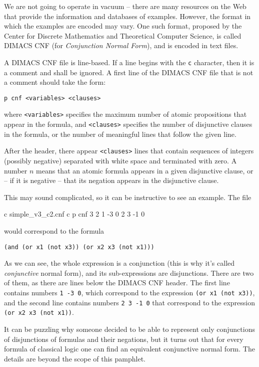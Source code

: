 We are not going to operate in vacuum -- there are many
resources on the Web that provide the information and databases
of examples. However, the format in which the examples are
encoded may vary. One such format, proposed by the Center
for Discrete Mathematics and Theoretical Computer Science,
is called DIMACS CNF (for \textit{Conjunction Normal Form}),
and is encoded in text files.

A DIMACS CNF file is line-based. If a line begins with the \texttt{c}
character, then it is a comment and shall be ignored. A first
line of the DIMACS CNF file that is not a comment should take the
form:

\texttt{p cnf <variables> <clauses>}

where \texttt{<variables>} specifies the maximum number of atomic
propositions that appear in the formula, and \texttt{<clauses>}
specifies the number of disjunctive clauses in the formula, or
the number of meaningful lines that follow the given line.

After the header, there appear \texttt{<clauses>} lines that
contain sequences of integers (possibly negative) separated with
white space and terminated with zero. A number $n$ means that
an atomic formula appears in a given disjunctive clause,
or -- if it is negative -- that its negation appears in the
disjunctive clause.

This may sound complicated, so it can be instructive to see
an example. The file

\begin{Snippet}
c simple_v3_c2.cnf
c
p cnf 3 2
1 -3 0
2 3 -1 0
\end{Snippet}

would correspond to the formula 

\texttt{(and (or x1 (not x3)) (or x2 x3 (not x1)))}

As we can see, the whole expression is a conjunction (this is
why it's called \textit{conjunctive} normal form), and its
sub-expressions are disjunctions. There are two of them,
as there are lines below the DIMACS CNF header. The first
line contains numbers \texttt{1 -3 0}, which correspond
to the expression \texttt{(or x1 (not x3))}, and the second
line contains numbers \texttt{2 3 -1 0} that correspond to
the expression \texttt{(or x2 x3 (not x1))}.

It can be puzzling why someone decided to be able to represent
only conjunctions of disjunctions of formulas and their negations,
but it turns out that for every formula of classical logic
one can find an equivalent conjunctive normal form. The details
are beyond the scope of this pamphlet.

